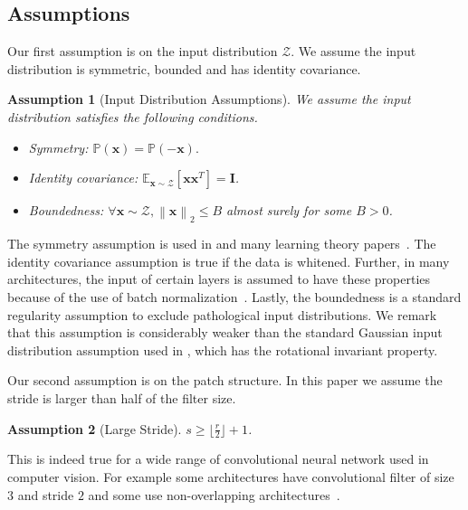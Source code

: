 \documentclass[11pt]{article}
\newcommand{\mat}[1]{\mathbf{#1}}
\newcommand{\vect}[1]{\mathbf{#1}}
\newcommand{\norm}[1]{\left\|#1\right\|}
\newcommand{\expect}{\mathbb{E}}
\newcommand{\prob}{\mathbb{P}}
\newcommand{\inputdist}{\mathcal{Z}}
\newtheorem{asmp}{Assumption}[section]
\begin{document}
\subsection{Assumptions}\label{sec:assumptions}
Our first assumption is on the input distribution $\inputdist$.
We assume the input distribution is symmetric, bounded and has identity covariance.
\begin{asmp}[Input Distribution Assumptions]
\label{asmp:input_dist}
We assume the input distribution satisfies the following conditions.
\begin{itemize}
\item Symmetry: $\prob\left(\vect{x}\right) = \prob\left(-\vect{x}\right).$
\item Identity covariance: $\expect_{\vect{x}\sim \inputdist }\left[\vect{x}\vect{x}^T\right] = \mat{I}$.
\item Boundedness: $\forall \vect{x}\sim \inputdist, \norm{\vect{x}}_2 \le B$ almost surely for some $B > 0$.
\end{itemize}
\end{asmp}
The symmetry assumption is used in \cite{goel2018learning} and many learning theory papers~\cite{baum1990polynomial}. The identity covariance assumption is true if the data is whitened. 
Further, in many architectures, the input of certain layers is assumed to have these properties because of the use of batch normalization~\citep{ioffe2015batch}.
Lastly, the boundedness is a standard regularity assumption to exclude pathological input distributions.
We remark that this assumption is considerably weaker than the standard Gaussian input distribution assumption used in \cite{tian2017analytical,zhong2017learning,du2017spurious}, which has the rotational invariant property.



Our second assumption is on the patch structure.
In this paper we assume the stride is larger than half of the filter size.
\begin{asmp}[Large Stride]
\label{asmp:large_stride}
$s \ge \lfloor \frac{r}{2}\rfloor + 1$.
\end{asmp}
This is indeed true for a wide range of convolutional neural network used in computer vision.
For example some architectures have convolutional filter of size $3$ and stride $2$ and some use non-overlapping architectures~\citep{he2016deep}.
\end{document}
